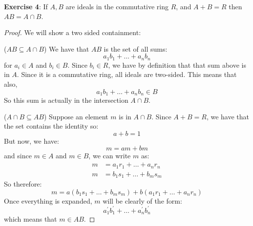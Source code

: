 \documentclass{article}
\begin{document}
\textbf{Exercise 4}: If $A, B$ are ideals in the commutative ring $R$, and $A + B = R$ then $AB = A \cap B$.
    \begin{proof}
        We will show a two sided containment:

        ($AB \subseteq A \cap B$) We have that $AB$ is the set of all sums:
            \begin{equation*}
                a_{1}b_{1} + \ldots + a_{n}b_{n}
            \end{equation*}
        for $a_{i} \in A$ and $b_{i} \in B$. Since $b_{i} \in R$, we have by definition that that sum above is in $A$. Since it is a commutative ring, all ideals are two-sided. This means that also,
            \begin{equation*}
                a_{1}b_{1} + \ldots + a_{n}b_{n} \in B
            \end{equation*}
        So this sum is actually in the intersection $A \cap B$. 

        ($A \cap  B \subseteq AB$) Suppose an element $m$ is in $A \cap B$. Since $A + B = R$, we have that the set contains the identity so:
            \begin{equation*}
                a + b = 1
            \end{equation*}
        But now, we have:
            \begin{equation*}
                m = am + bm
            \end{equation*}
        and since $m \in A$ and $m \in B$, we can write $m$ as:
            \begin{align*}
                m &= a_{1}r_{1} + \ldots + a_{n}r_{n} \\
                m &= b_{1}s_{1} + \ldots + b_{m}s_{m}
            \end{align*}
        So therefore:
            \begin{equation*}
                m = a(b_{1}s_{1} + \ldots + b_{m}s_{m}) + b(a_{1}r_{1} + \ldots + a_{n}r_{n})
            \end{equation*}
        Once everything is expanded, $m$ will be clearly of the form:
            \begin{equation*}
                a_{1}^{\prime}b_{1}^{\prime} + \ldots + a_{n}^{\prime}b_{n}^{\prime}
            \end{equation*}
        which means that $m \in AB$.
    \end{proof}
\end{document}
